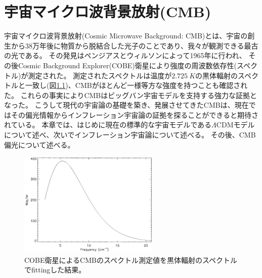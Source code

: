 \documentclass[../../main.tex]{subfiles}
\begin{document}
\chapter{宇宙マイクロ波背景放射(CMB)}
宇宙マイクロ波背景放射(Cosmic Microwave Background: CMB)とは、宇宙の創生から38万年後に物質から脱結合した光子のことであり、我々が観測できる最古の光である。
その発見はペンジアスとウィルソンによって1965年に行われ\cite{1965ApJ...142..419P}、
その後Cosmic Background Explorer(COBE)衛星により強度の周波数依存性(スペクトル)が測定された\cite{1996ApJ...473..576F}。
測定されたスペクトルは温度が$\SI{2.725}{K}$の黒体輻射のスペクトルと一致し(図\ref{fig:cobe})、CMBがほとんど一様等方な強度を持つことも確認された。
これらの事実によりCMBはビッグバン宇宙モデルを支持する強力な証拠となった。
こうして現代の宇宙論の基礎を築き、発展させてきたCMBは、現在ではその偏光情報からインフレーション宇宙論の証拠を探ることができると期待されている。
本章では、はじめに現在の標準的な宇宙モデルである$\Lambda\mathrm{CDM}$モデルについて述べ、次いでインフレーション宇宙論について述べる。
その後、CMB偏光について述べる。
\begin{figure}[H]
    \centering
    \includegraphics[width=0.6\textwidth]{intro/cobe.pdf}
    \caption{COBE衛星によるCMBのスペクトル測定値を黒体輻射のスペクトルでfittingした結果。}
    \label{fig:cobe}
\end{figure}
\end{document}
